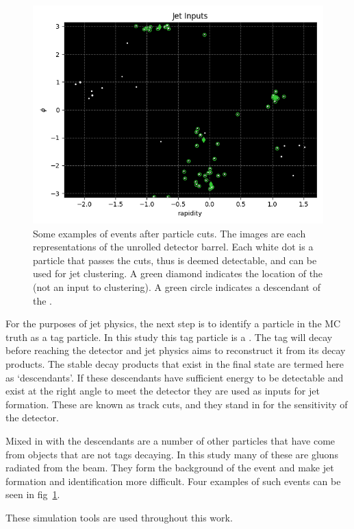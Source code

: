 \begin{figure}[htp]
\begin{minipage}[c]{0.48\textwidth}
        \includegraphics[width=1\textwidth]{graphics/truth_1378.png}
    \end{minipage}\hfill
    \caption{Some examples of events after particle cuts. 
             The images are each representations of the unrolled detector barrel.
             Each white dot is a particle that
             passes the cuts, thus is deemed detectable, and can be used for jet clustering.
             A green diamond indicates the location of the 
             (not an input to clustering).
         A green circle indicates a descendant of the .} \label{fig:event_tracks_example}
\end{figure}    


For the purposes of jet physics, the next step is to identify
a particle in the MC truth as a tag particle.
In this study this tag particle is a .
The tag will decay before reaching the detector and 
jet physics aims to reconstruct it from its decay products.
The stable decay products that exist in the final state 
are termed here as `descendants'.
If these descendants have sufficient energy to be detectable and exist
at the right angle to meet the detector they are used as inputs for jet formation.
These are known as track cuts, and they stand in for the sensitivity of the detector.

Mixed in with the descendants are a number of other particles that have come from objects
that are not tags decaying.
In this study many of these are gluons radiated from the beam.
They form the background of the event and make jet formation
and identification more difficult.
Four examples of such events can be seen in fig~\ref{fig:event_tracks_example}.

These simulation tools are used throughout this work.
